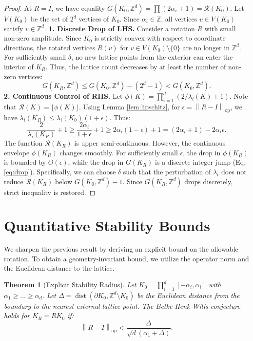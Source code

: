 \documentclass[11pt, reqno]{amsart}
\newtheorem{theorem}{Theorem}
\theoremstyle{definition}
\newcommand{\Z}{\mathbb{Z}}
\newcommand{\opnorm}[1]{\left\| #1 \right\|_{\mathrm{op}}} %
\DeclareMathOperator{\dist}{dist}
\begin{document}
\begin{proof}
At $R=I$, we have equality $G(K_0, \Z^d) = \prod (2\alpha_i + 1) = \mathcal{R}(K_0)$.
Let $V(K_0)$ be the set of $2^d$ vertices of $K_0$. Since $\alpha_i \in \Z$, all vertices $v \in V(K_0)$ satisfy $v \in \Z^d$.
\noindent \textbf{1. Discrete Drop of LHS.}
Consider a rotation $R$ with small non-zero amplitude. Since $K_0$ is strictly convex with respect to coordinate directions, the rotated vertices $R(v)$ for $v \in V(K_0) \setminus \{0\}$ are no longer in $\Z^d$.
For sufficiently small $\delta$, no new lattice points from the exterior can enter the interior of $K_R$. Thus, the lattice count decreases by at least the number of non-zero vertices:
\begin{equation} \label{eq:drop}
    G(K_R, \Z^d) \le G(K_0, \Z^d) - (2^d - 1) < G(K_0, \Z^d).
\end{equation}
\noindent \textbf{2. Continuous Control of RHS.}
Let $\phi(K) = \prod_{i=1}^d (2/\lambda_i(K) + 1)$. Note that $\mathcal{R}(K) = \lfloor \phi(K) \rfloor$.
Using Lemma \ref{lem:lipschitz}, for $\epsilon = \opnorm{R-I}$, we have $\lambda_i(K_R) \le \lambda_i(K_0)(1+\epsilon)$. Thus:
\[
\frac{2}{\lambda_i(K_R)} + 1 \ge \frac{2\alpha_i}{1+\epsilon} + 1 \ge 2\alpha_i(1-\epsilon) + 1 = (2\alpha_i+1) - 2\alpha_i\epsilon.
\]
The function $\mathcal{R}(K_R)$ is upper semi-continuous. However, the continuous envelope $\phi(K_R)$ changes smoothly. For sufficiently small $\epsilon$, the drop in $\phi(K_R)$ is bounded by $O(\epsilon)$, while the drop in $G(K_R)$ is a discrete integer jump (Eq. \ref{eq:drop}).
Specifically, we can choose $\delta$ such that the perturbation of $\lambda_i$ does not reduce $\mathcal{R}(K_R)$ below $G(K_0, \Z^d) - 1$.
Since $G(K_R, \Z^d)$ drops discretely, strict inequality is restored.
\end{proof}


\section{Quantitative Stability Bounds}

We sharpen the previous result by deriving an explicit bound on the allowable rotation.
To obtain a geometry-invariant bound, we utilize the operator norm and the Euclidean distance to the lattice.



\begin{theorem}[Explicit Stability Radius]
Let $K_0 = \prod_{i=1}^d [-\alpha_i, \alpha_i]$ with $\alpha_1 \ge \dots \ge \alpha_d$. Let $\Delta = \dist(\partial K_0, \Z^d \setminus K_0)$ be the Euclidean distance from the boundary to the nearest external lattice point.
The Betke-Henk-Wills conjecture holds for $K_R = R K_0$ if:
\begin{equation}
    \opnorm{R - I} < \frac{\Delta}{\sqrt{d}(\alpha_1 + \Delta)}.
\end{equation}
\end{theorem}
\end{document}
